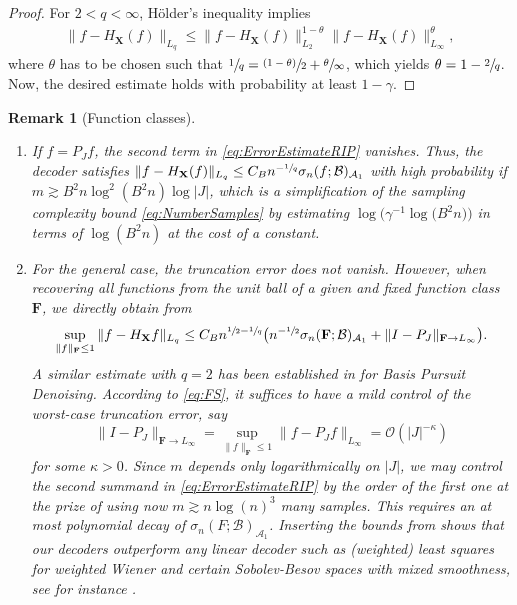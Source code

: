 \documentclass[11pt,reqno, a4paper]{article}
\numberwithin{equation}{section}
\newtheorem{remark}[theorem]{Remark}
\begin{document}
\begin{proof}
For $2<q<\infty$, H\"older's inequality implies
\begin{gather}
\lVert f - H_{\mathbf{X}}(f)\rVert_{L_q} \leq \lVert f - H_{\mathbf{X}}(f)\rVert_{L_2}^{1-\theta}\lVert f - H_{\mathbf{X}}(f)\rVert_{L_\infty}^\theta,
\end{gather}
where $\theta$ has to be chosen such that $\sfrac{1}{q}= \sfrac{(1-\theta)}{2}+ \sfrac{\theta}{\infty}$, which yields $\theta = 1 - \sfrac{2}{q}$.
Now, the desired estimate holds with probability at least $1-\gamma$.
\end{proof}

\begin{remark}[Function classes]\label{rem:FuncClass}
\hfill
\begin{enumerate}
\item If $f = P_J f$, the second term in \eqref{eq:ErrorEstimateRIP} vanishes.
Thus, the decoder satisfies $\lVert f - H_{\mathbf{X}}(f)\rVert_{L_q} \leq C_{B} n^{-\sfrac{1}{q}}\sigma_n(f;\mathcal{B})_{\mathcal{A}_1}$ with high probability if $m \gtrsim B^2n \log^2(B^2 n) \log\lvert J\rvert$, which is a simplification of the sampling complexity bound \eqref{eq:NumberSamples} by estimating $\log\bigl(\gamma^{-1}\log\bigl(B^2n\bigr)\bigr)$ in terms of $\log(B^2  n)$ at the cost of a constant.

\item For the general case, the truncation error does not vanish.
However, when recovering all functions from the unit ball of a given and fixed function class $\mathbf{F}$, we directly obtain from 
\begin{equation}\label{eq:FS}
    \sup\limits_{\|f\|_{\mathbf{F}}\leq 1} \|f-H_{\mathbf{X}}f\|_{L_q} \leq 
  C_B n^{\sfrac{1}{2}-\sfrac{1}{q}}\big(n^{-\sfrac{1}{2}}\sigma_n(\mathbf{F};\mathcal{B})_{\mathcal{A}_1} + \|I-P_J\|_{\mathbf{F}\to L_\infty}\big).
\end{equation}
A similar estimate with $q=2$ has been established in \cite{Kri23} for Basis Pursuit Denoising.
According to \eqref{eq:FS}, it suffices to have a mild control of the worst-case truncation error, say
\begin{equation}
    \|I-P_J\|_{\mathbf{F}\to L_\infty} = \sup_{\|f\|_{\mathbf{F}}\leq 1} \lVert f-P_Jf\rVert_{L_\infty} = \mathcal O(|J|^{-\kappa})
\end{equation}
for some $\kappa > 0$.
Since \(m\) depends only logarithmically on $|J|$, we may control the second summand in \eqref{eq:ErrorEstimateRIP} by the order of the first one at the prize of using  now $m\gtrsim   n\log(n)^3$ many samples. This requires an at most polynomial decay of $\sigma_n(F;\mathcal{B})_{\mathcal{A}_1}$. Inserting the bounds from \cite{MSU25} shows that our decoders outperform any linear decoder such as (weighted) least squares for weighted Wiener and certain Sobolev-Besov spaces with mixed smoothness, see for instance \cite[Thm.\ 6.1 and Cor.\ 6.8]{MSU25}.
\end{enumerate}
\end{remark}
\pagebreak
\end{document}
